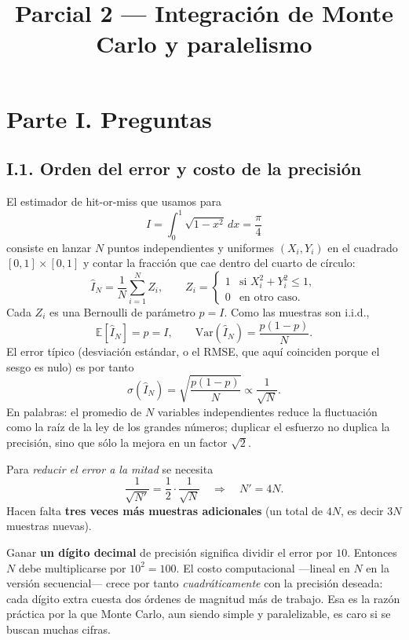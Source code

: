 \documentclass[12pt,a4paper]{article}
\title{Parcial 2 --- Integraci\'on de Monte Carlo y paralelismo}
\author{}
\date{}
\begin{document}
\maketitle

\section*{Parte I. Preguntas}

\subsection*{I.1. Orden del error y costo de la precisi\'on}

El estimador de hit-or-miss que usamos para
\[
I = \int_0^1 \sqrt{1-x^2}\,dx = \frac{\pi}{4}
\]
consiste en lanzar $N$ puntos independientes y uniformes $(X_i,Y_i)$ en el cuadrado $[0,1]\times[0,1]$ y contar la fracci\'on que cae dentro del cuarto de c\'irculo:
\[
\hat I_N = \frac{1}{N}\sum_{i=1}^{N} Z_i,
\qquad
Z_i =
\begin{cases}
1 & \text{si } X_i^2 + Y_i^2 \le 1,\\
0 & \text{en otro caso.}
\end{cases}
\]
Cada $Z_i$ es una Bernoulli de par\'ametro $p = I$. Como las muestras son i.i.d.,
\[
\mathbb{E}[\hat I_N] = p = I,
\qquad
\mathrm{Var}(\hat I_N) = \frac{p(1-p)}{N}.
\]
El error t\'ipico (desviaci\'on est\'andar, o el RMSE, que aqu\'i coinciden porque el sesgo es nulo) es por tanto
\[
\sigma(\hat I_N) = \sqrt{\frac{p(1-p)}{N}} \propto \frac{1}{\sqrt{N}}.
\]
En palabras: el promedio de $N$ variables independientes reduce la fluctuaci\'on como la ra\'iz de la ley de los grandes n\'umeros; duplicar el esfuerzo no duplica la precisi\'on, sino que s\'olo la mejora en un factor $\sqrt{2}$.

Para \emph{reducir el error a la mitad} se necesita
\[
\frac{1}{\sqrt{N'}} = \frac{1}{2}\cdot\frac{1}{\sqrt{N}}
\quad\Rightarrow\quad
N' = 4N.
\]
Hacen falta \textbf{tres veces m\'as muestras adicionales} (un total de $4N$, es decir $3N$ muestras nuevas).

Ganar \textbf{un d\'igito decimal} de precisi\'on significa dividir el error por $10$. Entonces $N$ debe multiplicarse por $10^2 = 100$. El costo computacional ---lineal en $N$ en la versi\'on secuencial--- crece por tanto \emph{cuadr\'aticamente} con la precisi\'on deseada: cada d\'igito extra cuesta dos \'ordenes de magnitud m\'as de trabajo. Esa es la raz\'on pr\'actica por la que Monte Carlo, aun siendo simple y paralelizable, es caro si se buscan muchas cifras.
\end{document}
